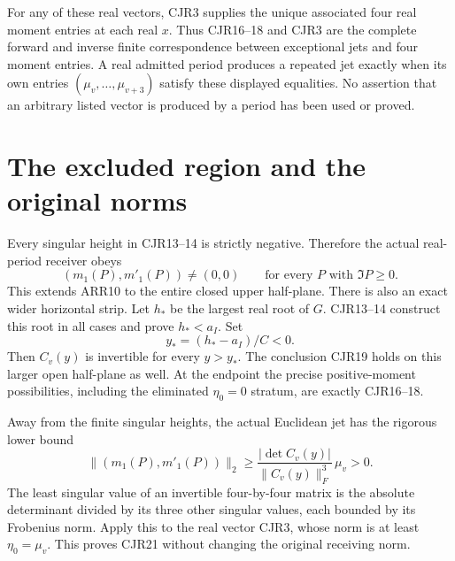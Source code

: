 \documentclass[11pt]{article}
\begin{document}
For any of these real vectors, CJR3 supplies the unique associated
four real moment entries at each real $x$. Thus CJR16--18 and
CJR3 are the complete forward and inverse finite correspondence
between exceptional jets and four moment entries. A real admitted
period produces a repeated jet exactly when its own entries
$(\mu_v,\ldots,\mu_{v+3})$ satisfy these displayed equalities.
No assertion that an arbitrary listed vector is produced by a
period has been used or proved.

\section{The excluded region and the original norms}
Every singular height in CJR13--14 is strictly negative. Therefore
the actual real-period receiver obeys
\[
 (m_1(P),m'_1(P))\ne(0,0)
 \qquad\text{for every }P\text{ with }\Im P\ge0.
 \tag{CJR19}
\]
This extends ARR10 to the entire closed upper half-plane.
There is also an exact wider horizontal strip. Let $h_*$ be the
largest real root of $G$. CJR13--14 construct this root in all
cases and prove $h_*<a_I$. Set
\[
 y_*=(h_*-a_I)/C<0.
 \tag{CJR20}
\]
Then $C_v(y)$ is invertible for every $y>y_*$. The conclusion
CJR19 holds on this larger open half-plane as well. At the endpoint
the precise positive-moment possibilities, including the eliminated
$\eta_0=0$ stratum, are exactly CJR16--18.

Away from the finite singular heights, the actual Euclidean jet
has the rigorous lower bound
\[
 \|(m_1(P),m'_1(P))\|_2
 \ge \frac{|\det C_v(y)|}{\|C_v(y)\|_F^3}\,\mu_v>0.
 \tag{CJR21}
\]
The least singular value of an invertible four-by-four matrix is
the absolute determinant divided by its three other singular
values, each bounded by its Frobenius norm. Apply this to the real
vector CJR3, whose norm is at least $\eta_0=\mu_v$.
This proves CJR21 without changing the original receiving norm.
\end{document}
